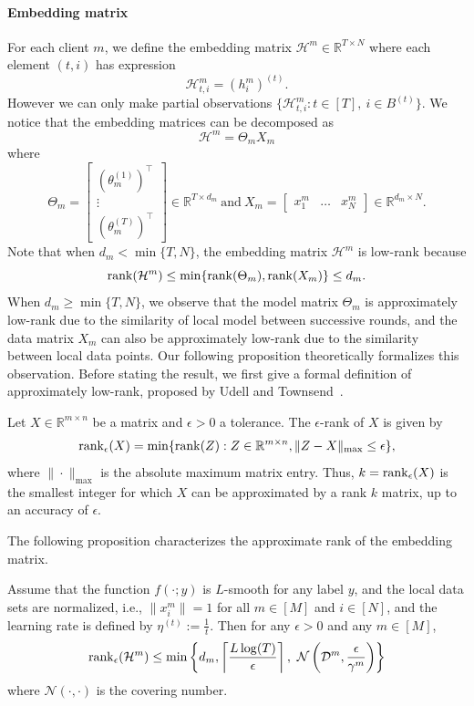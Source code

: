 \paragraph{Embedding matrix}
For each client $m$, we define the embedding matrix $\mathcal{H}^m \in \mathbb{R}^{T \times N}$ where each element $(t,i)$ has expression
\[\mathcal{H}_{t,i}^m = (h_i^m)^{(t)}.\]
However we can only make partial observations $\{\mathcal{H}^m_{t, i}: t \in [T], ~i \in B^{(t)}\}$. We notice that the embedding matrices can be decomposed as 
\[
  \mathcal{H}^m = \Theta_m X_m 
\]  
where
\[
  \Theta_m = \begin{bmatrix}
 (\theta_m^{(1)})^\intercal \\
 \vdots           \\
 (\theta_m^{(T)})^\intercal
  \end{bmatrix} \in \mathbb{R}^{T \times d_m}
  ~\text{and}~
  X_m = \begin{bmatrix}
    x_1^m  & \dots  & x_N^m 
  \end{bmatrix} \in \mathbb{R}^{d_m \times N}.
\]
Note that when $d_m < \min\{T, N\}$, the embedding matrix $\mathcal{H}^m$ is low-rank because
\[\operatorname{rank}(\mathcal{H}^m) \leq \min\{\operatorname{rank}(\Theta_m), \operatorname{rank}(X_m)\} \leq d_m.\]
When $d_m \geq \min\{T, N\}$, we observe that the model matrix $\Theta_m$ is approximately low-rank due to the similarity of local model between successive rounds, and the data matrix $X_m$ can also be approximately low-rank due to the similarity between local data points. Our following proposition theoretically formalizes this observation. Before stating the result, we first give a formal definition of approximately low-rank, proposed by Udell and Townsend~\cite{udell2019big}. 
\begin{definition} \label{def:rank}
    Let $X\in\mathbb{R}^{m\times n}$ be a matrix and $\epsilon>0$ a tolerance. The $\epsilon$-rank of $X$ is given by 
    \[\operatorname{rank}_{\epsilon}(X) = \min\{\operatorname{rank}(Z): Z\in\mathbb{R}^{m\times n}, \|Z - X\|_{\max} \leq \epsilon\},\]
    where $\|\cdot\|_{\max}$ is the absolute maximum matrix entry. Thus, $k = \operatorname{rank}_{\epsilon} (X)$ is the smallest integer for which $X$ can be approximated by a rank $k$ matrix, up to an accuracy of $\epsilon$.
\end{definition}
The following proposition characterizes the approximate rank of the embedding matrix. 
\begin{proposition} \label{prop:low-rank}
    Assume that the function $f(\cdot; y)$ is $L$-smooth for any label $y$, and the local data sets are normalized, i.e., $\|x^m_i\| = 1$ for all $m \in [M]$ and $i \in [N]$, and the learning rate is defined by $\eta^{(t)} := \frac{1}{t}$. 
    Then for any $\epsilon>0$ and any $m\in[M]$, 
    \begin{equation} \label{eq:epsilon_rank_u}
        \operatorname{rank}_{\epsilon}(\mathcal{H}^m) \leq \min\left\{ d_m, \left\lceil \frac{L\log(T)}{\epsilon} \right\rceil, ~\mathcal{N}\left(\mathcal{D}^m, \frac{\epsilon}{\gamma^m}\right) \right\}
    \end{equation} 
    where $\mathcal{N}(\cdot, \cdot)$ is the covering number.  
\end{proposition}


